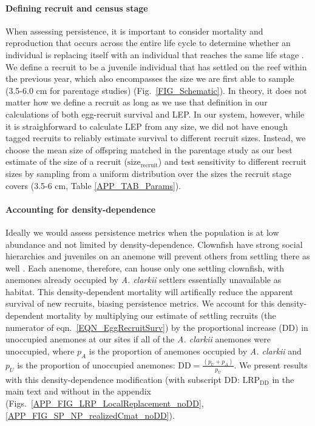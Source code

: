 \documentclass[12pt, oneside]{article}   	%
\begin{document}
\paragraph*{Defining recruit and census stage} 

When assessing persistence, it is important to consider mortality and reproduction that occurs across the entire life cycle to determine whether an individual is replacing itself with an individual that reaches the same life stage \citep{burgess2014beyond}. We define a recruit to be a juvenile individual that has settled on the reef within the previous year, which also encompasses the size we are first able to sample (3.5-6.0 cm for parentage studies) (Fig.\ \ref{FIG_Schematic}). In theory, it does not matter how we define a recruit as long as we use that definition in our calculations of both egg-recruit survival and LEP. In our system, however, while it is straighforward to calculate LEP from any size, we did not have enough tagged recruits to reliably estimate survival to different recruit sizes. Instead, we choose the mean size of offspring matched in the parentage study as our best estimate of the size of a recruit ($\text{size}_\text{recruit}$) and test sensitivity to different recruit sizes by sampling from a uniform distribution over the sizes the recruit stage covers (3.5-6 cm, Table \ref{APP_TAB_Params}).

\paragraph*{Accounting for density-dependence}  %

Ideally we would assess persistence metrics when the population is at low abundance and not limited by density-dependence. Clownfish have strong social hierarchies and juveniles on an anemone will prevent others from settling there as well \citep[seen in \textit{A. percula,}][]{buston2003forcible}. Each anenome, therefore, can house only one settling clownfish, with anemones already occupied by \textit{A. clarkii} settlers essentially unavailable as habitat. This density-dependent mortality will artifically reduce the apparent survival of new recruits, biasing persistence metrics. We account for this density-dependent mortality by multiplying our estimate of settling recruits (the numerator of eqn.\ \ref{EQN_EggRecruitSurv}) by the proportional increase ($\text{DD}$) in unoccupied anemones at our sites if all of the \textit{A. clarkii} anemones were unoccupied, where $p_A$ is the proportion of anemones occupied by \textit{A. clarkii} and $p_U$ is the proportion of unoccupied anemones: $\text{DD} = \frac{(p_U + p_A)}{p_U}$. We present results with this density-dependence modification (with subscript DD: $\text{LRP}_{\text{DD}}$ in the main text and without in the appendix (Figs.\ \ref{APP_FIG_LRP_LocalReplacement_noDD}, \ref{APP_FIG_SP_NP_realizedCmat_noDD}).
\end{document}
